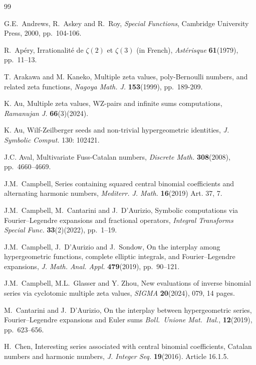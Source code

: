 \documentclass[11pt]{article}
\theoremstyle{plain}
\theoremstyle{definition}
\begin{document}
\begin{thebibliography}{99}

G.E.\ Andrews, R.\ Askey and R.\ Roy, \emph{Special Functions},
Cambridge University Press, 2000, pp.\ 104-106.

R.\ Ap\'ery, Irrationalit\'e de $\zeta(2)$ et $\zeta(3)$ (in French),
\emph{Ast\'erisque} \textbf{61}(1979), pp.\ 11--13.

T. Arakawa and M. Kaneko, Multiple zeta values, poly-Bernoulli numbers, and related zeta functions, \emph{Nagoya Math. J.} \textbf{153}(1999), pp.\ 189-209.

K. Au, Multiple zeta values, WZ-pairs and infinite sums computations, \emph{Ramanujan J.} \textbf{66}(3)(2024).

K. Au, Wilf-Zeilberger seeds and non-trivial hypergeometric identities, \emph{J. Symbolic Comput.} 130: 102421.

J.C. Aval, Multivariate Fuss-Catalan numbers, \emph{Discrete Math.} \textbf{308}(2008), pp.\ 4660--4669.

J.M.\ Campbell, Series containing squared central binomial coefficients and alternating harmonic
numbers,\emph{ Mediterr. J. Math.} \textbf{16}(2019) Art. 37, 7.

J.M.\ Campbell, M.\ Cantarini and J.\ D'Aurizio,
Symbolic computations via Fourier--Legendre expansions and fractional operators,
\emph{Integral Transforms Special Func.} \textbf{33}(2)(2022), pp.\ 1--19.

J.M.\ Campbell, J.\ D'Aurizio and J.\ Sondow,
On the interplay among hypergeometric functions, complete elliptic integrals, and Fourier--Legendre expansions,
\emph{J. Math. Anal. Appl.} \textbf{479}(2019), pp.\ 90--121.

J.M.\ Campbell, M.L.\ Glasser and Y. Zhou,
New evaluations of inverse binomial series via cyclotomic multiple zeta values, \emph{SIGMA} \textbf{20}(2024), 079, 14 pages.

M.\ Cantarini and J.\ D'Aurizio,
On the interplay between hypergeometric series, Fourier--Legendre expansions and Euler sums
\emph{Boll.\ Unione Mat.\ Ital.}, \textbf{12}(2019), pp.\ 623--656.

H.\ Chen, Interesting series associated with central binomial coefficients, Catalan numbers and harmonic
numbers, \emph{J. Integer Seq.} \textbf{19}(2016). Article 16.1.5.



\end{thebibliography}
\end{document}
